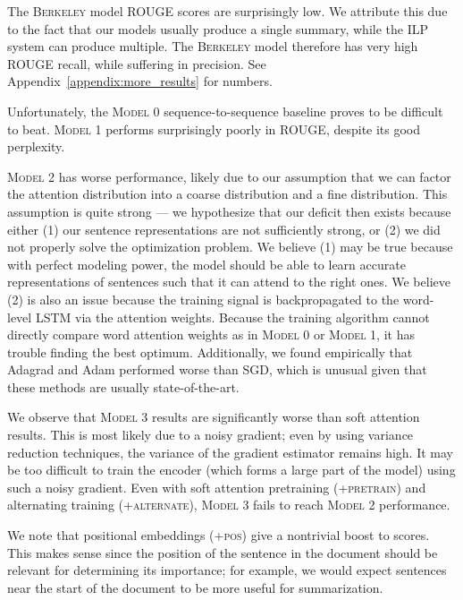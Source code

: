 \documentclass[12pt]{report}
\begin{document}
The \textsc{Berkeley} model ROUGE scores are surprisingly low. We attribute this due to the fact that our models usually produce a single summary, while the ILP system can produce multiple. The \textsc{Berkeley} model therefore has very high ROUGE recall, while suffering in precision. See Appendix~\ref{appendix:more_results} for numbers.

Unfortunately, the \textsc{Model 0} sequence-to-sequence baseline proves to be difficult to beat. \textsc{Model 1} performs surprisingly poorly in ROUGE, despite its good perplexity.


\textsc{Model 2} has worse performance, likely due to our assumption that we can factor the attention distribution into a coarse distribution and a fine distribution.
This assumption is quite strong --- we hypothesize that our deficit then exists because either (1) our sentence representations are not sufficiently strong, or (2) we did not properly solve the optimization problem.
We believe (1) may be true because with perfect modeling power, the model should be able to learn accurate representations of sentences such that it can attend to the right ones.
We believe (2) is also an issue because the training signal is backpropagated to the word-level LSTM via the attention weights. Because the training algorithm cannot directly compare word attention weights as in \textsc{Model 0} or \textsc{Model 1}, it has trouble finding the best optimum.
Additionally, we found empirically that Adagrad and Adam performed worse than SGD, which is unusual given that these methods are usually state-of-the-art.

We observe that \textsc{Model 3} results are significantly worse than soft attention results. This is most likely due to a noisy gradient; even by using variance reduction techniques, the variance of the gradient estimator remains high. It may be too difficult to train the encoder (which forms a large part of the model) using such a noisy gradient. Even with soft attention pretraining (\textsc{+pretrain}) and alternating training (\textsc{+alternate}), \textsc{Model 3} fails to reach \textsc{Model 2} performance.

We note that positional embeddings (\textsc{+pos}) give a nontrivial boost to scores. This makes sense since the position of the sentence in the document should be relevant for determining its importance; for example, we would expect sentences near the start of the document to be more useful for summarization.
\end{document}
